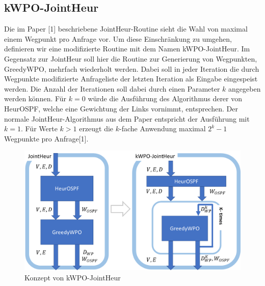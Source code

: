 \documentclass[sigconf,noacm,review]{acmart}
\begin{document}
\subsection{kWPO-JointHeur}
Die im Paper [1] beschriebene JointHeur-Routine sieht die Wahl von maximal einem Wegpunkt pro Anfrage vor. Um diese Einschränkung zu umgehen, definieren wir eine modifizierte Routine mit dem Namen kWPO-JointHeur. Im Gegensatz zur JointHeur soll hier die Routine zur Generierung von Wegpunkten, GreedyWPO, mehrfach wiederholt werden. Dabei soll in jeder Iteration die durch Wegpunkte modifizierte Anfrageliste der letzten Iteration als Eingabe eingespeist werden. 
Die Anzahl der Iterationen soll dabei durch einen Parameter $k$ angegeben werden können. Für $k = 0$ würde die Ausführung des Algorithmus derer von HeurOSPF, welche eine Gewichtung der Links vornimmt, entsprechen. Der normale JointHeur-Algorithmus aus dem Paper entspricht der Ausführung mit $k=1$. Für Werte $k > 1$ erzeugt die $k$-fache Anwendung maximal $2^{k}-1$ Wegpunkte pro Anfrage[1].
\begin{figure}[h]
  \centering 
  \includegraphics[width=\linewidth]{abbildungen/kWPO_Concept.png}
  \caption{Konzept von kWPO-JointHeur}
\end{figure}
\end{document}
